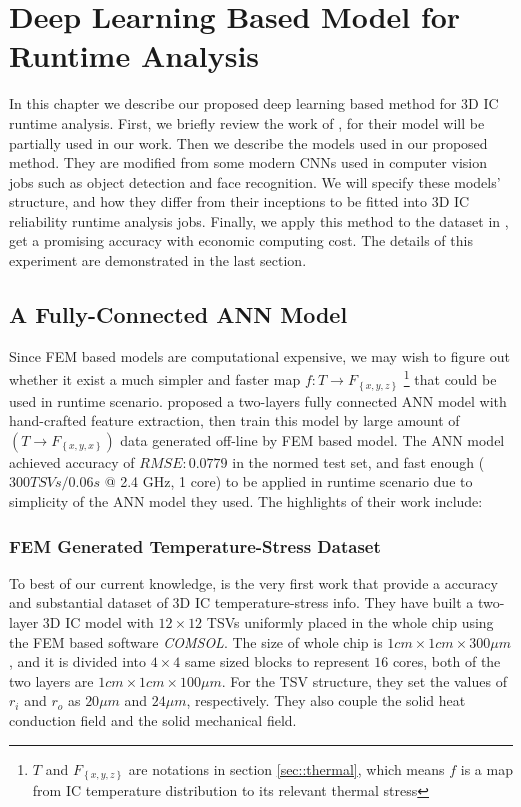 
\chapter{Deep Learning Based Model for Runtime Analysis}
In this chapter we describe our proposed deep learning based method for 3D IC runtime analysis.
First, we briefly review the work of \cite{Zhang2016Fast}, for their model
will be partially used in our work.
Then we describe the models used in our proposed method. They are modified from some modern
CNNs used in computer vision jobs such as object detection and face recognition.
We will specify these models' structure, and how they differ from their inceptions
to be fitted into 3D IC reliability runtime analysis jobs.
Finally, we apply this method to the dataset in \cite{Zhang2016Fast},
get a promising accuracy with economic computing cost.
The details of this experiment are demonstrated in the last section.

\section{A Fully-Connected ANN Model}
Since FEM based models are computational expensive, we may wish to figure out whether
it exist a much simpler and faster map $f: T \to F_{\left\{ x,y,z \right\}}$
\footnote{$T$ and $F_{\left\{ x,y,z \right\}}$ are notations in section \ref{sec::thermal}, which means
$f$ is a map from IC temperature distribution to its relevant thermal stress}
that could be used in runtime scenario.
\cite{Zhang2016Fast} proposed a two-layers fully connected ANN model with hand-crafted
feature extraction, then train this model by large amount of $(T \to F_{\left\{x,y,x\right\}})$ data
generated off-line by FEM based model. 
The ANN model achieved accuracy of $RMSE: 0.0779$ in the normed test set, and fast enough 
($300 TSVs / 0.06s$ @ 2.4 GHz, 1 core) to be applied
in runtime scenario due to simplicity of the ANN model they used.
The highlights of their work include:

\subsection{FEM Generated Temperature-Stress Dataset} \label{sec::FEM-data}
To best of our current knowledge, \cite{Zhang2016Fast} is the very first work that provide a
accuracy and substantial dataset of 3D IC temperature-stress info.
They have built a two-layer 3D IC model with $12\times12$ TSVs uniformly placed
in the whole chip using the FEM based software \textit{COMSOL}.
The size of whole chip is $1cm\times1cm\times300\mu m$, and it is
divided into $4\times4$ same sized blocks to represent $16$ cores,
both of the two layers are $1cm\times1cm\times100\mu m$. 
For the TSV structure, they set the values of $r_i$ and $r_o$
as $20\mu m$ and $24\mu m$, respectively. They also couple
the solid heat conduction field and the solid mechanical field.

